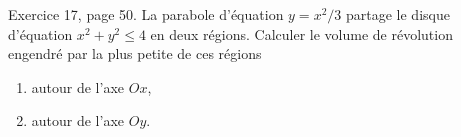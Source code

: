 \begin{exercice}\label{exoGeneral0027}

Exercice 17, page 50. La parabole d'équation $y=x^2/3$ partage le disque d'équation $x^2+y^2\leq 4$ en deux régions. Calculer le volume de révolution engendré par la plus petite de ces régions
\begin{enumerate}

\item
autour de l'axe $Ox$,
\item
autour de l'axe $Oy$.

\end{enumerate}

\end{exercice}
